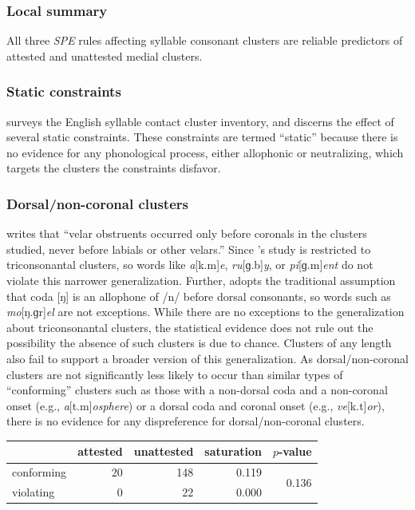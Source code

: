\subsubsection{Local summary}

All three \emph{SPE} rules affecting syllable consonant clusters are reliable predictors of attested and unattested medial clusters.

\subsubsection{Static constraints}

\citet{Pierrehumbert1994} surveys the English syllable contact cluster inventory, and discerns the effect of several static constraints. These constraints are termed ``static'' because there is no evidence for any phonological process, either allophonic or neutralizing, which targets the clusters the constraints disfavor.

\subsubsection{Dorsal/non-coronal clusters}

\citet[][173]{Pierrehumbert1994} writes that ``velar obstruents occurred only before coronals in the clusters studied, never before labials or other velars.'' Since \citeauthor{Pierrehumbert1994}'s study is restricted to triconsonantal clusters, so words like \emph{a}[k.m]\emph{e}, \emph{ru}[ɡ.b]\emph{y}, or \emph{pi}[ɡ.m]\emph{ent} do not violate this narrower generalization. Further, \citeauthor{Pierrehumbert1994} adopts the traditional assumption \citep[e.g.,][66f.]{Borowsky1986} that coda [ŋ] is an allophone of /n/ before dorsal consonants, so words such as \emph{mo}[ŋ.ɡr]\emph{el} are not exceptions. While there are no exceptions to the generalization about triconsonantal clusters, the statistical evidence does not rule out the possibility the absence of such clusters is due to chance. Clusters of any length also fail to support a broader version of this generalization. As dorsal/non-coronal clusters are not significantly less likely to occur than similar types of ``conforming'' clusters such as those with a non-dorsal coda and a non-coronal onset (e.g., \emph{a}[t.m]\emph{osphere}) or a dorsal coda and coronal onset (e.g., \emph{ve}[k.t]\emph{or}), there is no evidence for any dispreference for dorsal/non-coronal clusters.

\begin{example}
\begin{tabular}{l r r r r}
\toprule
           & attested & unattested & saturation & $p$-value              \\
\midrule
conforming & 20       & 148        & 0.119      & \multirow{2}{*}{0.136} \\
violating  &  0       &  22        & 0.000                               \\
\bottomrule
\end{tabular}
\end{example}

